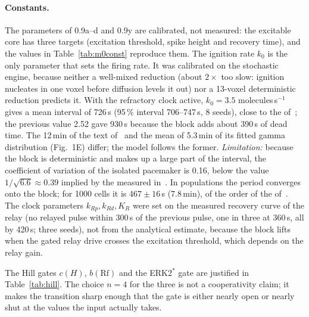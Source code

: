 \paragraph{Constants.}
The parameters of 0.9a--d and 0.9y are calibrated, not measured: the excitable core has three targets (excitation threshold, spike height and recovery time), and the values in Table~\ref{tab:m0const} reproduce them.
The ignition rate $k_0$ is the only parameter that sets the firing rate.
It was calibrated on the stochastic engine, because neither a well-mixed reduction (about $2\times$ too slow: ignition nucleates in one voxel before diffusion levels it out) nor a 13-voxel deterministic reduction predicts it.
With the refractory clock active, $k_0=3.5$ molecules\,s$^{-1}$ gives a mean interval of 726\,s (95\,\% interval 706--747\,s, 8 seeds), close to the  of~\cite{ford2023}; the previous value 2.52 gave 930\,s because the block adds about 390\,s of dead time.
The 12\,min of the text of~\cite{ford2023} and the mean of 5.3\,min of its fitted gamma distribution (Fig.~1E) differ; the model follows the former. \emph{Limitation:} because the block is deterministic and makes up a large part of the interval, the coefficient of variation of the isolated pacemaker is 0.16, below the value $1/\sqrt{6.6}\approx0.39$ implied by the  measured in~\cite{ford2023}.
In populations the period converges onto the block; for 1000 cells it is $467\pm16$\,s (7.8\,min), of the order of the  of~\cite{maeda2004}.
The clock parameters $k_{Rp},k_{Rd},K_R$ were set on the measured recovery curve of the relay (no relayed pulse within 300\,s of the previous pulse, one in three at 360\,s, all by 420\,s; three seeds), not from the analytical estimate, because the block lifts when the gated relay drive crosses the excitation threshold, which depends on the relay gain.

The Hill gates $c(H)$, $b(\mathrm{Rf})$ and the ERK2$^*$ gate are justified in Table~\ref{tab:hill}.
The choice $n=4$ for the three is not a cooperativity claim; it makes the transition sharp enough that the gate is either nearly open or nearly shut at the values the input actually takes.
